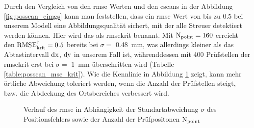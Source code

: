 Durch den Vergleich von den \acrshort{rmse} Werten und den \glspl{cscan} in der Abbildung \ref{fig:posscan_cimgs} kann man feststellen, dass ein \acrshort{rmse} Wert von bis zu 0.5 bei unserem Modell eine Abbildungsqualität sichert, mit der alle Streuer detektiert werden können. Hier wird das als \acrshort{rmsekrit} benannt. Mit $\operatorname{N}_{\operatorname{point}} = 160$ erreicht den $\operatorname{RMSE}^{\dagger}_{\operatorname{krit}} = 0.5$ bereits bei $\sigma =$ \SI{0.48}{\milli\metre}, was allerdings kleiner als das Abtastintervall $\operatorname{dx}$, $\operatorname{dy}$ in unserem Fall ist, währenddessen mit 400 Prüfstellen der \acrshort{rmsekrit} erst bei $\sigma =$ \SI{1}{\milli\metre} überschritten wird (Tabelle \ref{table:posscan_mse_krit}). Wie die Kennlinie in Abbildung \ref{fig:posscan_mse} zeigt, kann mehr örtliche Abweichung toleriert werden, wenn die Anzahl der Prüfstellen steigt, bzw. die Abdeckung des Ortsbereiches verbessert wird.  

\begin{figure}[h!]
\begin{center}
\caption[RMSE$^{\dagger}_{\krit}$ Auswertung des Positionsfehlers]{Verlauf des \acrshort{rmse} in Abhängigkeit der Standartabweichung $\sigma$ des Positionsfehlers sowie der Anzahl der Prüfpositonen $\operatorname{N}_{\operatorname{point}}$}
\label{fig:posscan_mse}
\end{center}
\end{figure}



